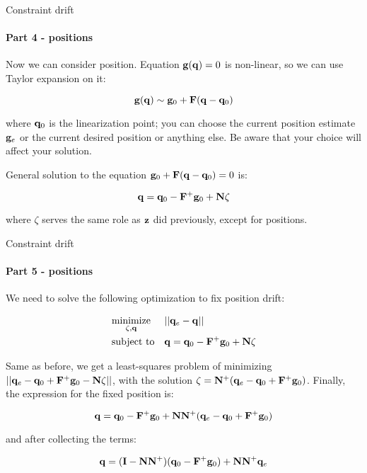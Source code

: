 \documentclass{beamer}
\begin{document}
\begin{frame}{Constraint drift}
\framesubtitle{Part 4 - positions}
\begin{flushleft}


Now we can consider position. Equation $\mathbf{g}(\mathbf{q}) = 0$ is non-linear, so we can use Taylor expansion on it:

\begin{equation}
    \mathbf{g}(\mathbf{q}) \sim \mathbf{g}_0 + \mathbf{F} (\mathbf{q} - \mathbf{q}_0) 
\end{equation}

where $\mathbf{q}_0$ is the linearization point; you can choose the current position estimate $\mathbf{g}_e$ or the current desired position or anything else. Be aware that your choice will affect your solution.

\bigskip

General solution to the equation $\mathbf{g}_0 + \mathbf{F} (\mathbf{q} - \mathbf{q}_0) = 0$ is:

\begin{equation}
    \mathbf{q} =  \mathbf{q}_0 - \mathbf{F}^+\mathbf{g}_0 + \mathbf{N}\zeta
\end{equation}

where $\zeta$ serves the same role as $\mathbf{z}$ did previously, except for positions.

\end{flushleft}
\end{frame}




\begin{frame}{Constraint drift}
\framesubtitle{Part 5 - positions}
\begin{flushleft}


We need to solve the following optimization to fix position drift:

\begin{equation}
\begin{aligned}
& \underset{\zeta, \bo{q}}{\text{minimize}}
& & || \bo{q}_e - \bo{q} || \\
& \text{subject to}
& & \bo{q} =  \bo{q}_0 - \bo{F}^+\bo{g}_0 + \bo{N}\zeta
%
\end{aligned}
\end{equation}

Same as before, we get a least-squares problem of minimizing $|| \mathbf{q}_e - \mathbf{q}_0 + \mathbf{F}^+\mathbf{g}_0 - \mathbf{N}\zeta ||$, with the solution $\zeta = \mathbf{N}^+(\mathbf{q}_e - \mathbf{q}_0 + \mathbf{F}^+\mathbf{g}_0)$. Finally, the expression for the fixed position is:

\begin{equation}
   \mathbf{q}  = \mathbf{q}_0 - \mathbf{F}^+\mathbf{g}_0 + \mathbf{N}\mathbf{N}^+(\mathbf{q}_e - \mathbf{q}_0 + \mathbf{F}^+\mathbf{g}_0)
\end{equation}

and after collecting the terms:

\begin{equation}
   \mathbf{q}  = (\mathbf{I} - \mathbf{N}\mathbf{N}^+) (\mathbf{q}_0 - \mathbf{F}^+\mathbf{g}_0) + \mathbf{N}\mathbf{N}^+\mathbf{q}_e
\end{equation}

\end{flushleft}
\end{frame}
\end{document}

